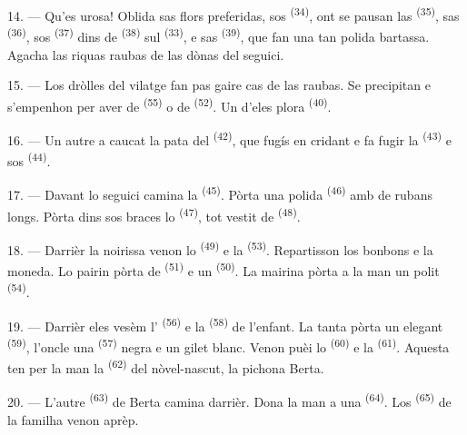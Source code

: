14. --- Qu'es urosa! Oblida sas flors preferidas, sos 
\textsuperscript{(34)}, ont se pausan las 
\textsuperscript{(35)}, sas  \textsuperscript{(36)}, sos
 \textsuperscript{(37)} dins de 
\textsuperscript{(38)} sul  \textsuperscript{(33)}, e sas
 \textsuperscript{(39)}, que fan una tan polida bartassa. Agacha las
riquas raubas de las dònas del seguici.

15. --- Los dròlles del vilatge fan pas gaire cas de las raubas. Se precipitan e
s'empenhon per aver de  \textsuperscript{(55)} o de
 \textsuperscript{(52)}. Un d'eles plora \textsuperscript{(40)}.

16. --- Un autre a caucat la pata del  \textsuperscript{(42)}, que
fugís en cridant e fa fugir la  \textsuperscript{(43)} e sos
 \textsuperscript{(44)}.

\VUsaut{5.0mm}
\VUsaut{4.0mm}

17. --- Davant lo seguici camina la  \textsuperscript{(45)}.
Pòrta una polida  \textsuperscript{(46)} amb de rubans longs. Pòrta
dins sos braces lo  \textsuperscript{(47)}, tot vestit de
 \textsuperscript{(48)}.

18. --- Darrièr la noirissa venon lo  \textsuperscript{(49)} e la
 \textsuperscript{(53)}. Repartisson los bonbons e la moneda. Lo
pairin pòrta de  \textsuperscript{(51)} e un  \textsuperscript{(50)}. La mairina pòrta a la man un polit 
\textsuperscript{(54)}.

19. --- Darrièr eles vesèm l' \textsuperscript{(56)} e la
 \textsuperscript{(58)} de l'enfant. La tanta pòrta un elegant
 \textsuperscript{(59)}, l'oncle una 
\textsuperscript{(57)} negra e un gilet blanc. Venon puèi lo 
\textsuperscript{(60)} e la  \textsuperscript{(61)}. Aquesta ten per
la man la  \textsuperscript{(62)} del nòvel-nascut, la pichona
Berta.

20. --- L'autre  \textsuperscript{(63)} de Berta camina darrièr.
Dona la man a una  \textsuperscript{(64)}. Los 
\textsuperscript{(65)} de la familha venon aprèp.

